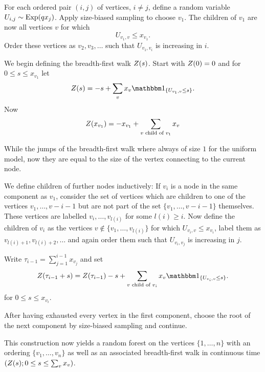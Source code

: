 For each ordered pair $(i, j)$ of vertices, $i \neq j$, define a random variable $U_{i,j} \sim \operatorname*{Exp}(q x_j)$.
Apply size-biased sampling to choose $v_1$.
The children of $v_1$ are now all vertices $v$ for which
\begin{equation}
	U_{v_1, v} \leq x_{v_1}.
\end{equation}
Order these vertices as $v_2, v_3, \dots$ such that $U_{v_1, v_i}$ is increasing in $i$.

We begin defining the breadth-first walk $Z(s)$.
Start with $Z(0) = 0$ and for $0 \leq s \leq x_{v_1}$ let
\begin{equation}
	\bfw(s) = -s + \sum_{v} x_v \Ind{\{U_{v_1, v} \leq s\}}.
\end{equation}
Now
\begin{equation}
	Z(x_{v_1}) = -x_{v_1} + \sum_{\text{$v$ child of $v_1$}} x_v
\end{equation}


While the jumps of the breadth-first walk where always of size $1$ for the uniform model,
now they are equal to the size of the vertex connecting to the current node.

We define children of further nodes inductively:
If $v_i$ is a node in the same component as $v_1$,
consider the set of vertices which are children to one of the vertices $v_1, \dots, v-{i-1}$
but are not part of the set $\{v_1, \dots, v-{i-1}\}$ themselves.
These vertices are labelled $v_i, \dots, v_{l(i)}$ for some $l(i) \geq i$.
Now define the children of $v_i$ as the vertices 
$v \notin \{v_1, \dots, v_{l(i)}\}$ for which $U_{v_i, v} \leq x_{v_i}$,
label them as $v_{l(i) + 1}, v_{l(i) + 2}, \dots$ 
and again order them such that $U_{v_i, v_j}$ is increasing in $j$.
 
Write $\tau_{i-1} = \sum_{j = 1}^{i-1} x_{v_j}$ and set
\begin{equation}
	\bfw(\tau_{i-1} + s) = \bfw(\tau_{i-1}) - s + \sum_{\text{$v$ child of $v_i$}} x_v \Ind{\{U_{v_i, v} \leq s\}}.
\end{equation}
for $0 \leq s \leq x_{v_i}$.

After having exhausted every vertex in the first component, 
choose the root of the next component by size-biased sampling and continue.

This construction now yields a random forest on the vertices $\{1,  \dots, n\}$
with an ordering $\{v_1, \dots, v_n\}$ 
as well as an associated breadth-first walk in continuous time $(Z(s); 0 \leq s \leq \sum_vx_v)$.


